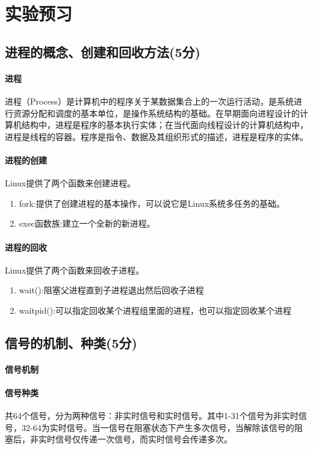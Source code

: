 \section{实验预习}
\subsection{进程的概念、创建和回收方法(5分)}

\paragraph{进程}进程（Process）是计算机中的程序关于某数据集合上的一次运行活动，是系统进行资源分配和调度的基本单位，是操作系统结构的基础。在早期面向进程设计的计算机结构中，进程是程序的基本执行实体；在当代面向线程设计的计算机结构中，进程是线程的容器。程序是指令、数据及其组织形式的描述，进程是程序的实体。

\paragraph{进程的创建}Linux提供了两个函数来创建进程。

\begin{enumerate}
    \item fork:提供了创建进程的基本操作，可以说它是Linux系统多任务的基础。
    \item exec函数族:建立一个全新的新进程。
\end{enumerate}

\paragraph{进程的回收}Linux提供了两个函数来回收子进程。

\begin{enumerate}
    \item wait():阻塞父进程直到子进程退出然后回收子进程
    \item waitpid():可以指定回收某个进程组里面的进程，也可以指定回收某个进程
\end{enumerate}

\subsection{信号的机制、种类(5分)}
\paragraph{信号机制}

\paragraph{信号种类}共64个信号，分为两种信号：非实时信号和实时信号。其中1-31个信号为非实时信号，32-64为实时信号。当一信号在阻塞状态下产生多次信号，当解除该信号的阻塞后，非实时信号仅传递一次信号，而实时信号会传递多次。

